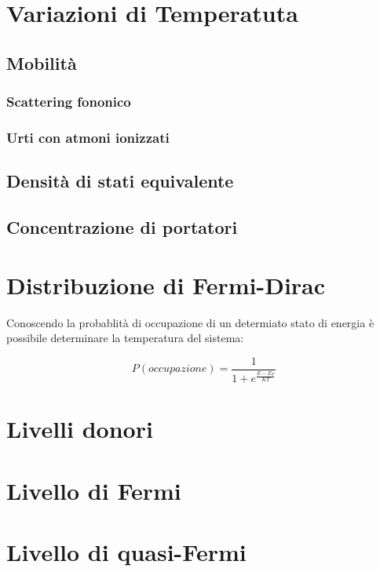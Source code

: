 \documentclass[10pt,a4paper]{report}
\begin{document}
\chapter{Variazioni di Temperatuta}

	\section{Mobilità}

		\subsection{Scattering fononico}



		\subsection{Urti con atmoni ionizzati}



	\section{Densità di stati equivalente}

	\section{Concentrazione di portatori}


\chapter{Distribuzione di Fermi-Dirac}

	Conoscendo la probablità di occupazione di un determiato stato di energia è possibile determinare la temperatura del sistema:

	\[
	P(occupazione)= \frac {1} { 1 + e^ { \frac{E-E_F} {KT} }}
	\]

\chapter{Livelli donori}

\chapter{Livello di Fermi}

\chapter{Livello di quasi-Fermi}
\end{document}
